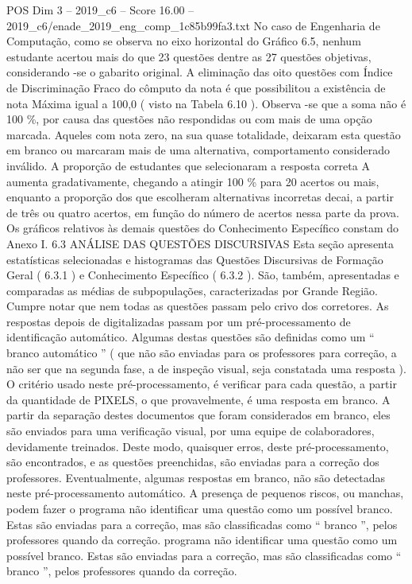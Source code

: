 \begin{textsample}{POS Dim 3 – 2019\_c6 – Score 16.00 – 2019\_c6/enade\_2019\_eng\_comp\_1c85b99fa3.txt}
No caso de Engenharia de Computação, como se observa no eixo horizontal do Gráfico 6.5, nenhum estudante acertou mais do que 23 questões dentre as 27 questões objetivas, considerando -se o gabarito original.
A eliminação das oito questões com Índice de Discriminação Fraco do cômputo da nota é que possibilitou a existência de nota Máxima igual a 100,0 ( visto na Tabela 6.10 ).
Observa -se que a soma não é 100 \%, por causa das questões não respondidas ou com mais de uma opção marcada.
Aqueles com nota zero, na sua quase totalidade, deixaram esta questão em branco ou marcaram mais de uma alternativa, comportamento considerado inválido.
A proporção de estudantes que selecionaram a resposta correta A aumenta gradativamente, chegando a atingir 100 \% para 20 acertos ou mais, enquanto a proporção dos que escolheram alternativas incorretas decai, a partir de três ou quatro acertos, em função do número de acertos nessa parte da prova.
Os gráficos relativos às demais questões do Conhecimento Específico constam do Anexo I. 6.3 ANÁLISE DAS QUESTÕES DISCURSIVAS Esta seção apresenta estatísticas selecionadas e histogramas das Questões Discursivas de Formação Geral ( 6.3.1 ) e Conhecimento Específico ( 6.3.2 ).
São, também, apresentadas e comparadas as médias de subpopulações, caracterizadas por Grande Região.
Cumpre notar que nem todas as questões passam pelo crivo dos corretores.
As respostas depois de digitalizadas passam por um pré-processamento de identificação automático.
Algumas destas questões são definidas como um “ branco automático ” ( que não são enviadas para os professores para correção, a não ser que na segunda fase, a de inspeção visual, seja constatada uma resposta ).
O critério usado neste pré-processamento, é verificar para cada questão, a partir da quantidade de PIXELS, o que provavelmente, é uma resposta em branco.
A partir da separação destes documentos que foram considerados em branco, eles são enviados para uma verificação visual, por uma equipe de colaboradores, devidamente treinados.
Deste modo, quaisquer erros, deste pré-processamento, são encontrados, e as questões preenchidas, são enviadas para a correção dos professores.
Eventualmente, algumas respostas em branco, não são detectadas neste pré-processamento automático.
A presença de pequenos riscos, ou manchas, podem fazer o programa não identificar uma questão como um possível branco.
Estas são enviadas para a correção, mas são classificadas como “ branco ”, pelos professores quando da correção. programa não identificar uma questão como um possível branco.
Estas são enviadas para a correção, mas são classificadas como “ branco ”, pelos professores quando da correção.

\end{textsample}

